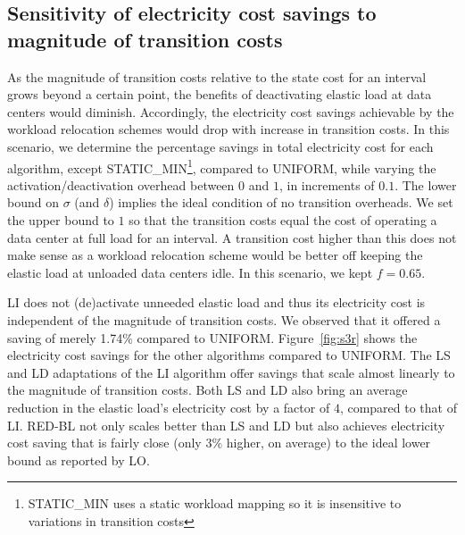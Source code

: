 \subsection{Sensitivity of electricity cost savings to magnitude of transition costs}
As the magnitude of transition costs relative to the state cost for an interval grows beyond a certain point, the benefits of deactivating elastic load at data centers would diminish. Accordingly, the electricity cost savings achievable by the workload relocation schemes would drop with increase in transition costs. In this scenario, we determine the percentage savings in total
    electricity cost for each algorithm, except
    STATIC\_MIN\footnote{STATIC\_MIN uses a static workload mapping so it is insensitive to variations in transition costs}, compared to UNIFORM, while varying the activation/deactivation overhead
    between $0$ and $1$, in increments of
    $0.1$. The lower bound on $\sigma$ (and $\delta$)
    implies the ideal condition of no transition overheads.
    We set the upper bound to $1$ so that the
    transition costs equal the cost of operating a data
    center at full load for an interval. A transition cost
    higher than this does not make sense as a workload relocation scheme would be better off keeping the elastic load at unloaded data centers idle. In this scenario,
    we kept $f=0.65$.

LI does not (de)activate unneeded elastic load and thus its electricity cost is independent of the magnitude of transition costs. We observed that it offered a saving of merely 1.74\% compared to UNIFORM. Figure~\ref{fig:s3r} shows the electricity cost savings for the other algorithms compared to UNIFORM. The LS and LD adaptations of the LI algorithm offer savings that scale almost linearly to the magnitude of transition costs. Both LS and LD also bring an average reduction in the elastic load's electricity cost by a factor of $4$, compared to that of LI. RED-BL not only scales better than LS and LD but also achieves electricity cost saving that is fairly close (only $3\%$ higher, on average) to the ideal lower bound as reported by LO.


